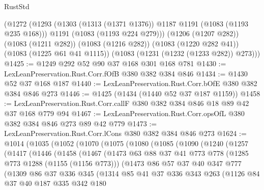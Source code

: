 \begin{lexlean}{RustStd}
\begin{coremodule}
    (@1272
      (@1293
        (@1303 (@1313 (@1371 @1376)) @1187 @1191 (@1083 (@1193 @235 @168)))
        @1191
        (@1083 (@1193 @224 @279)))
      (@1206 (@1207 @282))
      (@1083 (@1211 @282))
      (@1083 (@1216 @282))
      (@1083 (@1220 @282 @41))
      (@1083 (@1225 @61 @41 @1115))
      (@1083 (@1231 (@1232 (@1233 @282)) @273)))
@1425 := @1249 @292 @52 @90 @37 @168 @301 @168 @781
@1430 := LexLeanPreservation.Rust.Corr.fOfB @380 @382 @384 @846
@1434 := @1430 @52 @37 @168 @187
@1440 := LexLeanPreservation.Rust.Corr.bOfE @380 @382 @384 @846 @273
@1446 := @1425 (@1434 (@1440 @52 @37 @187 @1159))
@1458 := LexLeanPreservation.Rust.Corr.callF @380 @382 @384 @846 @18 @89 @42 @37 @168 @779 @94
@1467 := LexLeanPreservation.Rust.Corr.opsOfL @380 @382 @384 @846 @273 @89 @42 @779
@1473 := LexLeanPreservation.Rust.Corr.lCons @380 @382 @384 @846 @273
@1624 := @1014
    (@1035
      (@1052
        (@1070
          (@1075
            (@1080
              (@1085
                (@1090
                  (@1240
                    (@1257
                      (@1417
                        (@1446
                          (@1458
                            (@1467
                              (@1473
                                @63
                                @88
                                @37
                                @41
                                @773
                                @778
                                (@1285 @773 @1288 (@1155 (@1156 @773)))
                                (@1473
                                  @86
                                  @57
                                  @37
                                  @40
                                  @347
                                  @777
                                  (@1309
                                    @86
                                    @37
                                    @336
                                    @345
                                    (@1314
                                      @85
                                      @41
                                      @37
                                      @336
                                      @343
                                      @263
                                      (@1126
                                        @84
                                        @37
                                        @40
                                        @187
                                        @335
                                        @342
                                        @180

\end{coremodule}
\end{lexlean}

